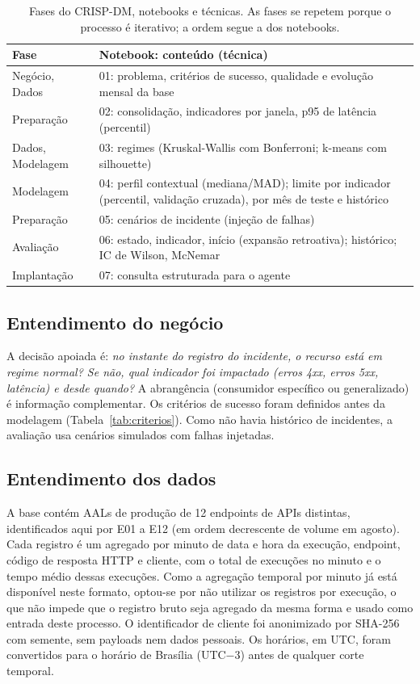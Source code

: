 \documentclass[sigconf,nonacm]{acmart}
\begin{document}
\begin{table}[t]
  \caption{Fases do CRISP-DM, notebooks e técnicas. As fases se repetem porque
  o processo é iterativo; a ordem segue a dos notebooks.}
  \label{tab:fases}
  \small
  \begin{tabular}{p{}p{}}
    \toprule
    Fase & Notebook: conteúdo (técnica) \\
    \midrule
    Negócio, Dados & 01: problema, critérios de sucesso, qualidade e evolução mensal da base \\
    Preparação & 02: consolidação, indicadores por janela, p95 de latência (percentil) \\
    Dados, Modelagem & 03: regimes (Kruskal-Wallis com Bonferroni; k-means com silhouette) \\
    Modelagem & 04: perfil contextual (mediana/MAD); limite por indicador (percentil, validação cruzada), por mês de teste e histórico \\
    Preparação & 05: cenários de incidente (injeção de falhas) \\
    Avaliação & 06: estado, indicador, início (expansão retroativa); histórico; IC de Wilson, McNemar \\
    Implantação & 07: consulta estruturada para o agente \\
    \bottomrule
  \end{tabular}
\end{table}

\subsection{Entendimento do negócio}
A decisão apoiada é: \emph{no instante do registro do incidente, o recurso está em regime normal? Se não, qual indicador foi impactado (erros 4xx, erros 5xx, latência) e desde quando?} A abrangência (consumidor específico ou generalizado) é informação complementar. Os critérios de sucesso foram definidos antes da modelagem (Tabela~\ref{tab:criterios}). Como não havia histórico de incidentes, a avaliação usa cenários simulados com falhas injetadas.

\subsection{Entendimento dos dados}
A base contém AALs de produção de 12 endpoints de APIs distintas, identificados aqui por E01 a E12 (em ordem decrescente de volume em agosto). Cada registro é um agregado por minuto de data e hora da execução, endpoint, código de resposta HTTP e cliente, com o total de execuções no minuto e o tempo médio dessas execuções. Como a agregação temporal por minuto já está disponível neste formato, optou-se por não utilizar os registros por execução, o que não impede que o registro bruto seja agregado da mesma forma e usado como entrada deste processo. O identificador de cliente foi anonimizado por SHA-256 com semente, sem payloads nem dados pessoais. Os horários, em UTC, foram convertidos para o horário de Brasília (UTC$-3$) antes de qualquer corte temporal.
\end{document}
